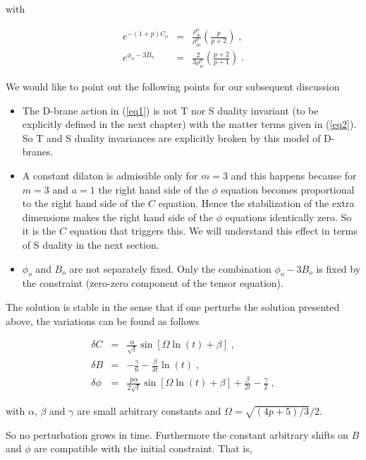 \documentclass[aps,floatfix,twocolumn,amsmath]{revtex4}
\newcommand{\bea}{\begin{eqnarray}}
\newcommand{\eea}{\end{eqnarray}}
\begin{document}
\noindent with

\begin{subequations}
\bea
e^{-(1+p)C_{o}}&=&\frac{\rho_{w}^{o}}{\rho_{m}^{o}}\left(\frac{p}{p+2}\right)\;,\\
e^{\phi_{o}-3B_{o}}&=&\frac{2}{3\rho_{w}^{o}}\left(\frac{p+2}{p+1}\right)\;.
\eea
\end{subequations}

We would like to point out the following points for our subsequent discussion

\begin{itemize}
\item{} The D-brane action in (\ref{eq1}) is not T nor S duality invariant (to be explicitly defined in the next chapter) with the matter terms given in (\ref{eq2}). So T and S duality invariances are explicitly broken by this model of D-branes.
\item{} A constant dilaton is admissible only for $m=3$ and this happens because for $m=3$ and $a=1$ the right hand side of the $\phi$ equation becomes proportional to the right hand side of the $C$ equation. Hence the stabilization of the extra dimensions makes the
right hand side of the $\phi$ equations identically zero. So it is the $C$ equation that triggers this. We will understand this effect in terms of S duality in the next section.
\item{} $\phi_{o}$ and $B_{o}$ are not separately fixed. Only the combination $\phi_{o}-3B_{o}$ is fixed by the constraint (zero-zero component of the tensor equation).
\end{itemize}


The solution is stable in the sense that if one perturbs the solution presented above, the variations can be found as follows

\begin{subequations}
\bea
\delta C&=&\frac{\alpha}{\sqrt{t}}\sin\left[\Omega\ln(t)+\beta\right]\;,\\
\delta B&=&-\frac{\gamma}{6}-\frac{\beta}{3t}\ln(t)\;,\\
\delta\phi&=&\frac{p\alpha}{2\sqrt{t}}\sin\left[\Omega\ln(t)+\beta\right]+\frac{\beta}{2t}-\frac{\gamma}{2}\;,
\eea
\end{subequations}

\noindent with $\alpha$, $\beta$ and $\gamma$ are small arbitrary constants and $\Omega=\sqrt{(4p+5)/3}/2$.

So no perturbation grows in time. Furthermore the constant arbitrary shifts on $B$ and $\phi$ are compatible with the initial constraint. That is,
\end{document}
